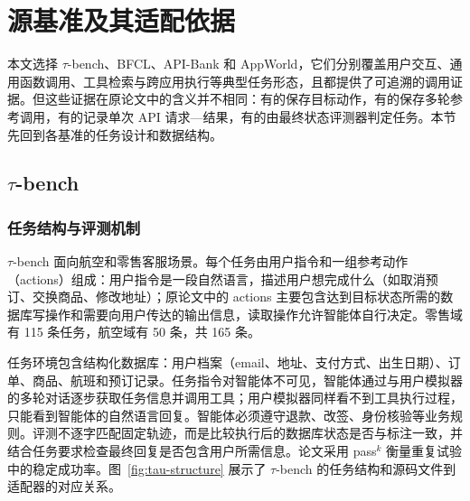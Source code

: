 \section{源基准及其适配依据}

本文选择 $\tau$-bench、BFCL、API-Bank 和 AppWorld，它们分别覆盖用户交互、通用函数调用、工具检索与跨应用执行等典型任务形态，且都提供了可追溯的调用证据。但这些证据在原论文中的含义并不相同：有的保存目标动作，有的保存多轮参考调用，有的记录单次 API 请求—结果，有的由最终状态评测器判定任务。本节先回到各基准的任务设计和数据结构。

\subsection{\texorpdfstring{$\tau$-bench}{tau-bench}}

\subsubsection{任务结构与评测机制}

$\tau$-bench 面向航空和零售客服场景\citep{yao2025taubench}。每个任务由用户指令和一组参考动作（actions）组成：用户指令是一段自然语言，描述用户想完成什么（如取消预订、交换商品、修改地址）；原论文中的 actions 主要包含达到目标状态所需的数据库写操作和需要向用户传达的输出信息，读取操作允许智能体自行决定。零售域有 115 条任务，航空域有 50 条，共 165 条。

任务环境包含结构化数据库：用户档案（email、地址、支付方式、出生日期）、订单、商品、航班和预订记录。任务指令对智能体不可见，智能体通过与用户模拟器的多轮对话逐步获取任务信息并调用工具；用户模拟器同样看不到工具执行过程，只能看到智能体的自然语言回复。智能体必须遵守退款、改签、身份核验等业务规则。评测不逐字匹配固定轨迹，而是比较执行后的数据库状态是否与标注一致，并结合任务要求检查最终回复是否包含用户所需信息。论文采用 pass$^k$ 衡量重复试验中的稳定成功率。图~\ref{fig:tau-structure} 展示了 $\tau$-bench 的任务结构和源码文件到适配器的对应关系。

